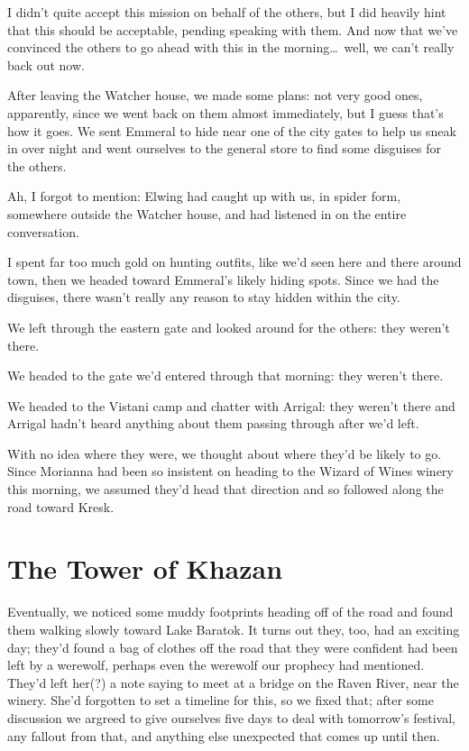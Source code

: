I didn't quite accept this mission on behalf of the others, but I did heavily hint that this should be acceptable, pending speaking with them. And now that we've convinced the others to go ahead with this in the morning\dots\ well, we can't really back out now.

After leaving the Watcher house, we made some plans: not very good ones, apparently, since we went back on them almost immediately, but I guess that's how it goes. We sent Emmeral to hide near one of the city gates to help us sneak in over night and went ourselves to the general store to find some disguises for the others.

Ah, I forgot to mention: Elwing had caught up with us, in spider form, somewhere outside the Watcher house, and had listened in on the entire conversation.

I spent far too much gold on hunting outfits, like we'd seen here and there around town, then we headed toward Emmeral's likely hiding spots. Since we had the disguises, there wasn't really any reason to stay hidden within the city.

We left through the eastern gate and looked around for the others: they weren't there.

We headed to the gate we'd entered through that morning: they weren't there.

We headed to the Vistani camp and chatter with Arrigal: they weren't there and Arrigal hadn't heard anything about them passing through after we'd left.

With no idea where they were, we thought about where they'd be likely to go. Since Morianna had been so insistent on heading to the Wizard of Wines winery this morning, we assumed they'd head that direction and so followed along the road toward Kresk.

\section*{The Tower of Khazan}
Eventually, we noticed some muddy footprints heading off of the road and found them walking slowly toward Lake Baratok. It turns out they, too, had an exciting day; they'd found a bag of clothes off the road that they were confident had been left by a werewolf, perhaps even the werewolf our prophecy had mentioned. They'd left her(?) a note saying to meet at a bridge on the Raven River, near the winery. She'd forgotten to set a timeline for this, so we fixed that; after some discussion we argreed to give ourselves five days to deal with tomorrow's festival, any fallout from that, and anything else unexpected that comes up until then.

